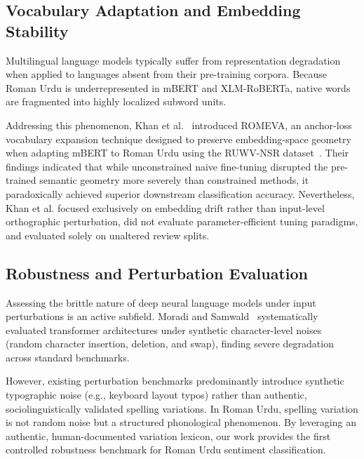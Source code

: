 \subsection{Vocabulary Adaptation and Embedding Stability}
Multilingual language models typically suffer from representation degradation when applied to languages absent from their pre-training corpora. Because Roman Urdu is underrepresented in mBERT and XLM-RoBERTa, native words are fragmented into highly localized subword units. 

Addressing this phenomenon, Khan et al.~\cite{khan2026romeva} introduced ROMEVA, an anchor-loss vocabulary expansion technique designed to preserve embedding-space geometry when adapting mBERT to Roman Urdu using the RUWV-NSR dataset~\cite{ahmed2024ruwvnsr}. Their findings indicated that while unconstrained naive fine-tuning disrupted the pre-trained semantic geometry more severely than constrained methods, it paradoxically achieved superior downstream classification accuracy. Nevertheless, Khan et al. focused exclusively on embedding drift rather than input-level orthographic perturbation, did not evaluate parameter-efficient tuning paradigms, and evaluated solely on unaltered review splits.

\subsection{Robustness and Perturbation Evaluation}
Assessing the brittle nature of deep neural language models under input perturbations is an active subfield. Moradi and Samwald~\cite{moradi2021evaluating} systematically evaluated transformer architectures under synthetic character-level noises (random character insertion, deletion, and swap), finding severe degradation across standard benchmarks.

However, existing perturbation benchmarks predominantly introduce synthetic typographic noise (e.g., keyboard layout typos) rather than authentic, sociolinguistically validated spelling variations. In Roman Urdu, spelling variation is not random noise but a structured phonological phenomenon. By leveraging an authentic, human-documented variation lexicon, our work provides the first controlled robustness benchmark for Roman Urdu sentiment classification.

